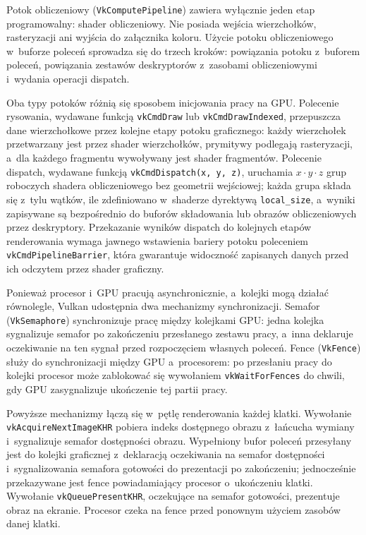 Potok obliczeniowy (\texttt{VkComputePipeline}) zawiera wyłącznie jeden etap
programowalny: shader obliczeniowy. Nie posiada wejścia wierzchołków, rasteryzacji
ani wyjścia do załącznika koloru. Użycie potoku obliczeniowego w~buforze poleceń
sprowadza się do trzech kroków: powiązania potoku z~buforem poleceń, powiązania
zestawów deskryptorów z~zasobami obliczeniowymi i~wydania operacji dispatch.

Oba typy potoków różnią się sposobem inicjowania pracy na GPU. Polecenie rysowania, 
wydawane funkcją \texttt{vkCmdDraw} lub \texttt{vkCmdDrawIndexed},
przepuszcza dane wierzchołkowe przez kolejne etapy potoku graficznego: każdy wierzchołek
przetwarzany jest przez shader wierzchołków, prymitywy podlegają rasteryzacji,
a~dla każdego fragmentu wywoływany jest shader fragmentów. Polecenie dispatch, wydawane
funkcją \texttt{vkCmdDispatch(x,\,y,\,z)}, uruchamia $x \cdot y \cdot z$ grup roboczych
shadera obliczeniowego bez geometrii wejściowej; każda grupa składa się z~tylu wątków,
ile zdefiniowano w~shaderze dyrektywą \texttt{local\_size}, a~wyniki zapisywane są
bezpośrednio do buforów składowania lub obrazów obliczeniowych przez deskryptory.
Przekazanie wyników dispatch do kolejnych etapów renderowania wymaga jawnego wstawienia
bariery potoku poleceniem \texttt{vkCmdPipelineBarrier}, która gwarantuje widoczność
zapisanych danych przed ich odczytem przez shader graficzny.

Ponieważ procesor i~GPU pracują asynchronicznie, a~kolejki mogą działać równolegle,
Vulkan udostępnia dwa mechanizmy synchronizacji. Semafor (\texttt{VkSemaphore})
synchronizuje pracę między kolejkami GPU: jedna kolejka sygnalizuje semafor po
zakończeniu przesłanego zestawu pracy, a~inna deklaruje oczekiwanie na ten sygnał
przed rozpoczęciem własnych poleceń. Fence (\texttt{VkFence}) służy do
synchronizacji między GPU a~procesorem: po przesłaniu pracy do kolejki procesor
może zablokować się wywołaniem \texttt{vkWaitForFences} do chwili, gdy GPU
zasygnalizuje ukończenie tej partii pracy.

Powyższe mechanizmy łączą się w~pętlę renderowania każdej klatki. Wywołanie
\texttt{vkAcquireNextImageKHR} pobiera indeks dostępnego obrazu z~łańcucha wymiany
i~sygnalizuje semafor dostępności obrazu. Wypełniony bufor poleceń przesyłany jest
do kolejki graficznej z~deklaracją oczekiwania na semafor dostępności i~sygnalizowania
semafora gotowości do prezentacji po zakończeniu; jednocześnie przekazywane jest
fence powiadamiający procesor o~ukończeniu klatki. Wywołanie
\texttt{vkQueuePresentKHR}, oczekujące na semafor gotowości, prezentuje obraz
na ekranie. Procesor czeka na fence przed ponownym użyciem zasobów danej klatki.

